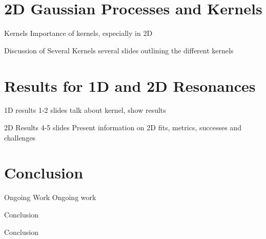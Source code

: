 \documentclass[10pt]{beamer}
\begin{document}
\section{2D Gaussian Processes and Kernels}
\label{sec:2d-gauss-proc}
\begin{frame}{Kernels}
  Importance of kernels, especially in 2D
\end{frame}

\begin{frame}{Discussion of Several Kernels}
  several slides outlining the different kernels 
\end{frame}

\section{Results for 1D and 2D Resonances}
\label{sec:results-1d-2d}
\begin{frame}{1D results}
  1-2 slides
  talk about kernel, show results
\end{frame}


\begin{frame}{2D Results}
  4-5 slides
  Present information on 2D fits, metrics, successes and challenges
\end{frame}


\section{Conclusion}
\label{sec:conclusion}

\begin{frame}{Ongoing Work}
Ongoing work
  
\end{frame}

\begin{frame}{Conclusion}

  Conclusion
  
\end{frame}
\end{document}
